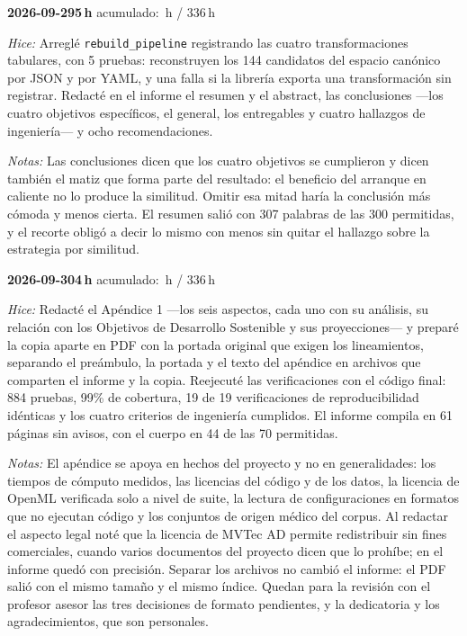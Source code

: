 \documentclass[11pt,letterpaper]{article}
\newcommand{\presupuesto}{336}
\newcommand{\horasacum}{0}
\newcommand{\entrada}[4]{%
  \xdef\horasacum{\fpeval{\horasacum + #2}}%
  \par\medskip
  \noindent\textbf{\color{tecnavy}#1}\quad\textbf{#2\,h}%
  \hfill{\small\color{gris}acumulado: \horasacum\,h / \presupuesto\,h}\par
  \nopagebreak
  \noindent\textit{Hice:} #3\par
  \nopagebreak
  \noindent\textit{Notas:} #4\par
}
\begin{document}
\entrada{2026-09-29}{5}
{Arreglé \texttt{rebuild\_pipeline} registrando las cuatro transformaciones tabulares, con 5
 pruebas: reconstruyen los 144 candidatos del espacio canónico por JSON y por YAML, y una falla
 si la librería exporta una transformación sin registrar. Redacté en el informe el resumen y el
 abstract, las conclusiones ---los cuatro objetivos específicos, el general, los entregables y
 cuatro hallazgos de ingeniería--- y ocho recomendaciones.}
{Las conclusiones dicen que los cuatro objetivos se cumplieron y dicen también el matiz que
 forma parte del resultado: el beneficio del arranque en caliente no lo produce la similitud.
 Omitir esa mitad haría la conclusión más cómoda y menos cierta. El resumen salió con 307
 palabras de las 300 permitidas, y el recorte obligó a decir lo mismo con menos sin quitar el
 hallazgo sobre la estrategia por similitud.}

\entrada{2026-09-30}{4}
{Redacté el Apéndice 1 ---los seis aspectos, cada uno con su análisis, su relación con los
 Objetivos de Desarrollo Sostenible y sus proyecciones--- y preparé la copia aparte en PDF con
 la portada original que exigen los lineamientos, separando el preámbulo, la portada y el texto
 del apéndice en archivos que comparten el informe y la copia. Reejecuté las verificaciones con
 el código final: 884 pruebas, 99\% de cobertura, 19 de 19 verificaciones de reproducibilidad
 idénticas y los cuatro criterios de ingeniería cumplidos. El informe compila en 61 páginas sin
 avisos, con el cuerpo en 44 de las 70 permitidas.}
{El apéndice se apoya en hechos del proyecto y no en generalidades: los tiempos de cómputo
 medidos, las licencias del código y de los datos, la licencia de OpenML verificada solo a nivel
 de suite, la lectura de configuraciones en formatos que no ejecutan código y los conjuntos de
 origen médico del corpus. Al redactar el aspecto legal noté que la licencia de MVTec AD permite
 redistribuir sin fines comerciales, cuando varios documentos del proyecto dicen que lo
 prohíbe; en el informe quedó con precisión. Separar los archivos no cambió el informe: el PDF
 salió con el mismo tamaño y el mismo índice. Quedan para la revisión con el profesor asesor
 las tres decisiones de formato pendientes, y la dedicatoria y los agradecimientos, que son
 personales.}
\end{document}
